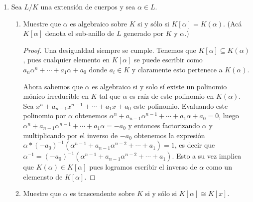 \documentclass[letter,twoside,12pt]{article}
\begin{document}
\begin{enumerate}
\begin{enumerate}
\item Suponga que toda extensión finita de $ \mathbb{R} $ es simple. Muestre que no existe $ L $ extensión finita $ \mathbb{R} $ de
grado $ [L : \mathbb{R}] $ impar.

\begin{proof}
De nuevo suponiendo por contradicción que $ L $ es una extensión finita de $ \mathbb{R} $ de grado impar tendriamos que existe algún elemento $ \alpha \in L $ tal que su polinomio mínimal es de grado impar.

Pero en $ \mathbb{R} $ todo polinomio mónico impar tiene por lo menos una raiz lo que implica que es reducible. Para demostrar esto podemos utilizar el teorema de valor intermedio de cálculo. Sea $ P(x) $ el polinomio irreducible. Como el polinomio es mónico de grado impar tenemos que su limite al infinito es igual a infinito y su limite a menos infinito es menos infinito. Entonces podemos tomar un valor $ a $ tal que $ P(a)< 0 $ y un valor $ b $ tal que $ P(b) > 0 $. Entonces por el teorema del valor intermedio existe un valor $ c $ entre $ a $ y $ b $ tal que $ P(c)=0 $, es decir, que $ c $ es una raíz de $ P(x) $.
\end{proof}
\end{enumerate}

\item Sea $ L/K $ una extensión de cuerpos y sea $ \alpha \in L $.

\begin{enumerate}
\item Muestre que $ \alpha $ es algebraico sobre $ K $ si y sólo si $ K[\alpha]  = K(\alpha ) $. (Acá $ K[\alpha] $ denota el sub-anillo de $ L $ generado por $ K $ y $ \alpha $.)
\begin{proof}
Una desigualdad siempre se cumple. Tenemos que $ K[\alpha] \subseteq K(\alpha)  $, pues cualquier elemento en $ K[\alpha] $ se puede escribir como $ a_n\alpha^n+\cdots+a_1\alpha+a_0 $ donde $ a_i \in K $ y claramente esto pertenece a $ K(\alpha) $.

Ahora sabemos que $ \alpha $ es algebraico si y solo sí existe un polinomio mónico irreducible en $ K $ tal que $ \alpha $ es raíz de este polinomio en $ K(\alpha) $. Sea $ x^n+a_{n-1}x^{n-1}+\cdots+a_1x+a_0 $ este polinomio. Evaluando este polinomio por $ \alpha $ obtenemos $ \alpha^n+a_{n-1}\alpha^{n-1}+\cdots+a_1\alpha+a_0 = 0$, luego $ \alpha^n+a_{n-1}\alpha^{n-1}+\cdots+a_1\alpha=-a_0 $ y entonces factorizando $ \alpha $ y multiplicando por el inverso de $ -a_0 $
obtenemos la expresión $ \alpha*(-a_0)^{-1}(\alpha^{n-1}+a_{n-1}\alpha^{n-2}+\cdots+a_1)=1 $, es decir que $ \alpha^{-1} = (-a_0)^{-1}(\alpha^{n-1}+a_{n-1}\alpha^{n-2}+\cdots+a_1)  $. Esto a su vez implica que $ K(\alpha) \in K[\alpha] $ pues logramos escribir el inverso de $ \alpha $ como un elemensto de $ K[\alpha] $.
\end{proof}
\item Muestre que $ \alpha $ es trascendente sobre $ K $ si y sólo si $ K[\alpha]  \cong K[x] $.


\end{enumerate}
\end{enumerate}
\end{document}
